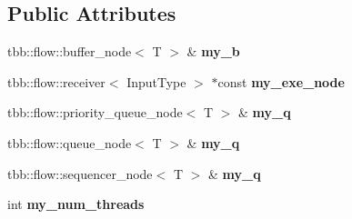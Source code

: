 \subsection*{Public Attributes}
\begin{DoxyCompactItemize}
\item 
\hypertarget{structparallel__puts_a4de9493bc5a3213666f27824cd1840a5}{}tbb\+::flow\+::buffer\+\_\+node$<$ T $>$ \& {\bfseries my\+\_\+b}\label{structparallel__puts_a4de9493bc5a3213666f27824cd1840a5}

\item 
\hypertarget{structparallel__puts_a6e5a9657cc7ce5dcb7261870aef8921e}{}tbb\+::flow\+::receiver$<$ Input\+Type $>$ $\ast$const {\bfseries my\+\_\+exe\+\_\+node}\label{structparallel__puts_a6e5a9657cc7ce5dcb7261870aef8921e}

\item 
\hypertarget{structparallel__puts_a57148303d9b7d71931ea38909303e9d4}{}tbb\+::flow\+::priority\+\_\+queue\+\_\+node$<$ T $>$ \& {\bfseries my\+\_\+q}\label{structparallel__puts_a57148303d9b7d71931ea38909303e9d4}

\item 
\hypertarget{structparallel__puts_a9af5a5b185cca3a1067fa7bab2a55667}{}tbb\+::flow\+::queue\+\_\+node$<$ T $>$ \& {\bfseries my\+\_\+q}\label{structparallel__puts_a9af5a5b185cca3a1067fa7bab2a55667}

\item 
\hypertarget{structparallel__puts_af5fc256867e9205534c9e3624924b7c9}{}tbb\+::flow\+::sequencer\+\_\+node$<$ T $>$ \& {\bfseries my\+\_\+q}\label{structparallel__puts_af5fc256867e9205534c9e3624924b7c9}

\item 
\hypertarget{structparallel__puts_ad39e475d4dc800a56c69ba68896b9782}{}int {\bfseries my\+\_\+num\+\_\+threads}\label{structparallel__puts_ad39e475d4dc800a56c69ba68896b9782}

\end{DoxyCompactItemize}


